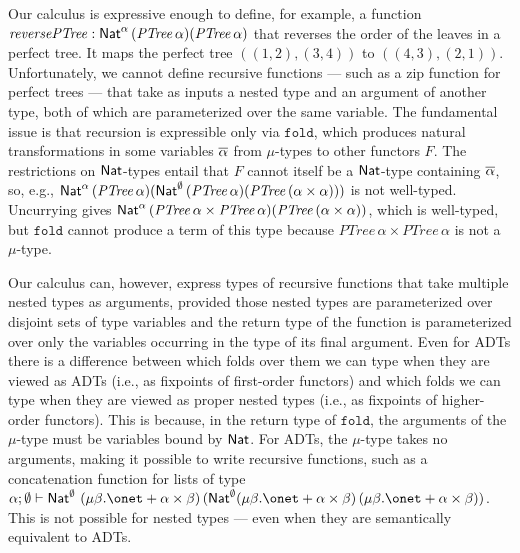 \documentclass[runningheads]{llncs}
\begin{document}
\begin{comment}
\mathtt{balg\; x \;(bcons \;(bcons\; y \;bbx)\; bbbx) =}\\
\hspace*{0.5in} \mathtt{bcons\; y\; (bcons\; (bcons \;x \;bbx) \;bbbx)}\\
\end{array}\]
\vspace*{-0.2in}\caption{$\mathtt{reverseBush}$ and auxiliary
  functions in Agda}\label{fig:funs2} 
\end{minipage}}\vspace*{-0.25in}
\end{figure*}
\end{comment}

Our calculus is expressive enough to define, for example, a function
$\mathit{reversePTree}: \mathsf{Nat}^\alpha \, (\mathit{PTree}\,\alpha)
(\mathit{PTree}\,\alpha)$ that reverses the order of the leaves in a
perfect tree. It maps the perfect tree $((1, 2), (3, 4))$ to $((4, 3),
(2, 1))$.  Unfortunately, we cannot define recursive functions ---
such as a zip function for perfect trees --- that take as inputs a
nested type and an argument of another type, both of which are
parameterized over the same variable. The fundamental issue is that
recursion is expressible only via $\mathtt{fold}$, which produces
natural transformations in some variables $\overline{\alpha}$ from
$\mu$-types to other functors $F$. The restrictions on $\mathsf{Nat}$-types
entail that $F$ cannot itself be a $\mathsf{Nat}$-type containing
$\overline{\alpha}$, so, e.g., $\mathsf{Nat}^\alpha \, (\mathit{PTree}\,\alpha)
(\mathsf{Nat}^\emptyset \, (\mathit{PTree}\,\alpha) (\mathit{PTree}\,(\alpha
\times \alpha)))$ is not well-typed.  Uncurrying gives $\mathsf{Nat}^\alpha \,
(\mathit{PTree}\,\alpha \times \mathit{PTree}\,\alpha)
(\mathit{PTree}\,(\alpha \times \alpha))$, which is well-typed, but
$\mathtt{fold}$ cannot produce a term of this type
because $\mathit{PTree}\,\alpha \times \mathit{PTree}\,\alpha$ is not
a $\mu$-type.


Our calculus can, however, express types of recursive functions that
take multiple nested types as arguments, provided those nested types
are parameterized over disjoint sets of type variables and the return
type of the function is parameterized over only the variables
occurring in the type of its final argument.  Even for ADTs there is a
difference between which folds over them we can type when they are
viewed as ADTs (i.e., as fixpoints of first-order functors) and which
folds we can type when they are viewed as proper nested types (i.e.,
as fixpoints of higher-order functors). This is because, in the return
type of $\mathtt{fold}$, the arguments of the $\mu$-type must be
variables bound by $\mathsf{Nat}$.  For ADTs, the $\mu$-type takes no
arguments, making it possible to write recursive functions, such as a
concatenation function for lists of type $\alpha ; \emptyset \vdash
\Nat^\emptyset \ (\mu \beta. \onet + \alpha \times \beta)\,
(\Nat^\emptyset (\mu \beta. \onet + \alpha \times \beta) \, (\mu
\beta. \onet + \alpha \times \beta))$.  This is not possible for
nested types --- even when they are semantically equivalent to ADTs.
\end{document}
